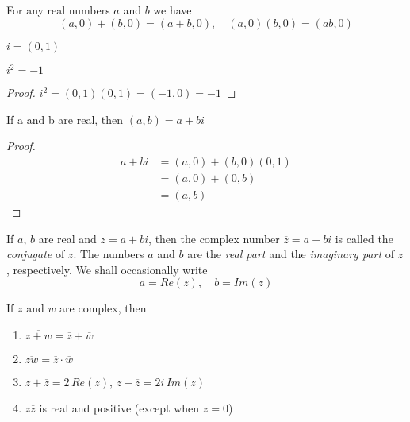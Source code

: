 \documentclass[../poma-notes.tex]{subfiles}
\begin{document}
\begin{theorem}
	For any real numbers $a$ and $b$ we have
	\[(a,0) + (b,0) = (a+b,0), \quad (a,0)(b,0) = (ab,0)\]
\end{theorem}

\begin{definition}
	$i=(0,1)$
\end{definition}

\setcounter{poma}{27}
\begin{theorem}
	$i^2=-1$
\end{theorem}

\begin{proof}
	$i^2 = (0,1)(0,1) = (-1,0) = -1$
\end{proof}

\begin{theorem}
	If a and b are real, then $(a,b)=a+bi$
\end{theorem}

\begin{proof}
	\vspace{-26pt}
	\begin{align*}
		\mathcal{} a+bi & = (a,0) + (b,0)(0,1) \\
		                & = (a,0) + (0,b)      \\
		                & = (a,b)
	\end{align*}
\end{proof}

\begin{definition}
	If $a$, $b$ are real and $z=a+bi$, then the complex number $\overline{z}=a-bi$ is called the \textit{conjugate} of $z$.
	The numbers $a$ and $b$ are the \textit{real part} and the \textit{imaginary part} of $z$, respectively.
	We shall occasionally write
	\[ a = Re(z),\quad b=Im(z)\]
\end{definition}

\begin{theorem}
	If $z$ and $w$ are complex, then
	\begin{enumerate}[label=(\alph*)]
		\item $\overline{z + w} = \overline{z} + \overline{w}$
		\item $\overline{zw} = \overline{z} \cdot \overline{w}$
		\item $z + \overline{z} = 2 \, Re(z), \, z - \overline{z} = 2i \, Im(z)$
		\item $z\overline{z}$ is real and positive (except when $z=0$)
	\end{enumerate}
\end{theorem}
\end{document}
